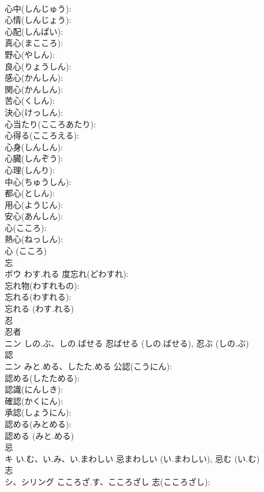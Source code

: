 \documentclass[8pt]{extreport}
\begin{document}
\begin{CJK}{UTF8}{min}
\\	心中(しんじゅう): 
\\	心情(しんじょう): 
\\	心配(しんぱい): 
\\	真心(まこころ): 
\\	野心(やしん): 
\\	良心(りょうしん): 
\\	感心(かんしん): 
\\	関心(かんしん): 
\\	苦心(くしん): 
\\	決心(けっしん): 
\\	心当たり(こころあたり): 
\\	心得る(こころえる): 
\\	心身(しんしん): 
\\	心臓(しんぞう): 
\\	心理(しんり): 
\\	中心(ちゅうしん): 
\\	都心(としん): 
\\	用心(ようじん): 
\\	安心(あんしん): 
\\	心(こころ): 
\\	熱心(ねっしん): 
\\	心 (こころ)
\\	忘			
\\	ボウ	わす.れる	度忘れ(どわすれ): 
\\	忘れ物(わすれもの): 
\\	忘れる(わすれる): 
\\	忘れる (わす.れる)
\\	忍			
\\	忍者 
\\	ニン	しの.ぶ、しの.ばせる		忍ばせる (しの.ばせる), 忍ぶ (しの.ぶ)
\\	認			
\\	ニン	みと.める、したた.める	公認(こうにん): 
\\	認める(したためる): 
\\	認識(にんしき): 
\\	確認(かくにん): 
\\	承認(しょうにん): 
\\	認める(みとめる): 
\\	認める (みと.める)
\\	忌			
\\	キ	い.む、い.み、い.まわしい		忌まわしい (い.まわしい), 忌む (い.む)
\\	志			
\\	シ、シリング	こころざ.す、こころざし	志(こころざし): 

\end{CJK}
\end{document}

